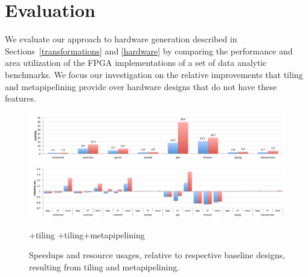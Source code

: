 \section{Evaluation}
\label{evaluation}



We evaluate our approach to hardware generation described in Sections~\ref{transformations} and \ref{hardware} by comparing the performance and
area utilization of the FPGA implementations of a set of data analytic benchmarks.
We focus our investigation on the relative improvements that tiling and metapipelining provide over hardware designs that do not have these features.

\begin{figure}[ht]
\centering
\includegraphics[width=\textwidth]{figs/newspeedupbars1.pdf}

\vspace{-10pt}

\includegraphics[width=\textwidth]{figs/newspeedupbars2.pdf}

{
\selectfont
\footnotesize
+tiling
\hspace{2em}
+tiling+metapipelining
}

\caption{Speedups and resource usages, relative to respective baseline designs, resulting from tiling and metapipelining.}
\label{fig:speedup-bars}
\end{figure}

